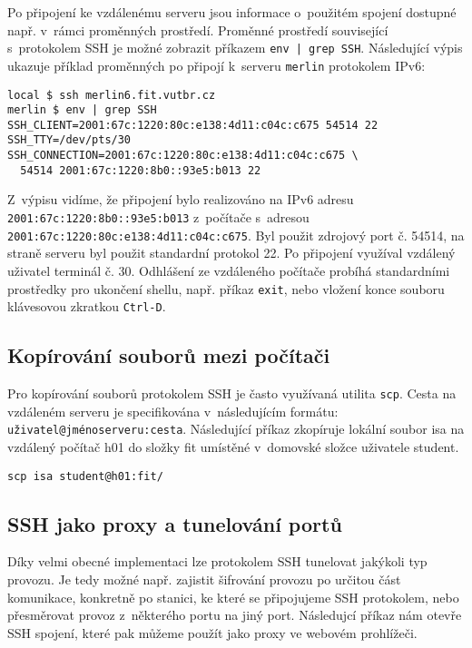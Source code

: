 Po připojení ke vzdálenému serveru jsou informace o~použitém spojení dostupné např. v~rámci
 proměnných prostředí. Proměnné prostředí související s~protokolem SSH je možné zobrazit
 příkazem {\tt env | grep SSH}. Následující výpis ukazuje příklad proměnných po připojí
 k~serveru {\tt merlin} protokolem IPv6:

\begin{verbatim}
local $ ssh merlin6.fit.vutbr.cz 
merlin $ env | grep SSH
SSH_CLIENT=2001:67c:1220:80c:e138:4d11:c04c:c675 54514 22
SSH_TTY=/dev/pts/30
SSH_CONNECTION=2001:67c:1220:80c:e138:4d11:c04c:c675 \
  54514 2001:67c:1220:8b0::93e5:b013 22
\end{verbatim}

Z~výpisu vidíme, že připojení bylo realizováno na IPv6 adresu {\tt 2001:67c:1220:8b0::93e5:b013}
 z~počítače s~adresou {\tt 2001:67c:1220:80c:e138:4d11:c04c:c675}. Byl použit zdrojový port č. 54514,
 na straně serveru byl použit standardní protokol 22. Po připojení využíval vzdálený uživatel
 terminál č. 30. Odhlášení ze vzdáleného počítače probíhá standardními prostředky pro ukončení
 shellu, např. příkaz {\tt exit}, nebo vložení konce souboru klávesovou zkratkou {\tt Ctrl-D}.

\subsection{Kopírování souborů mezi počítači}

Pro kopírování souborů protokolem SSH je často využívaná utilita {\tt scp}. Cesta na vzdáleném
 serveru je specifikována v~následujícím formátu: {\tt uživatel@jménoserveru:cesta}.
 Následující příkaz zkopíruje lokální soubor isa na vzdálený počítač h01 do
 složky fit umístěné v~domovské složce uživatele student.

\begin{verbatim}
scp isa student@h01:fit/
\end{verbatim}

\subsection{SSH jako proxy a tunelování portů}
Díky velmi obecné implementaci lze protokolem SSH tunelovat jakýkoli typ provozu. Je tedy možné
 např. zajistit šifrování provozu po určitou část komunikace, konkretně po stanici, ke které
 se připojujeme SSH protokolem, nebo přesměrovat provoz z~některého portu na jiný port. Následujcí
 příkaz nám otevře SSH spojení, které pak můžeme použít jako proxy ve webovém prohlížeči.

